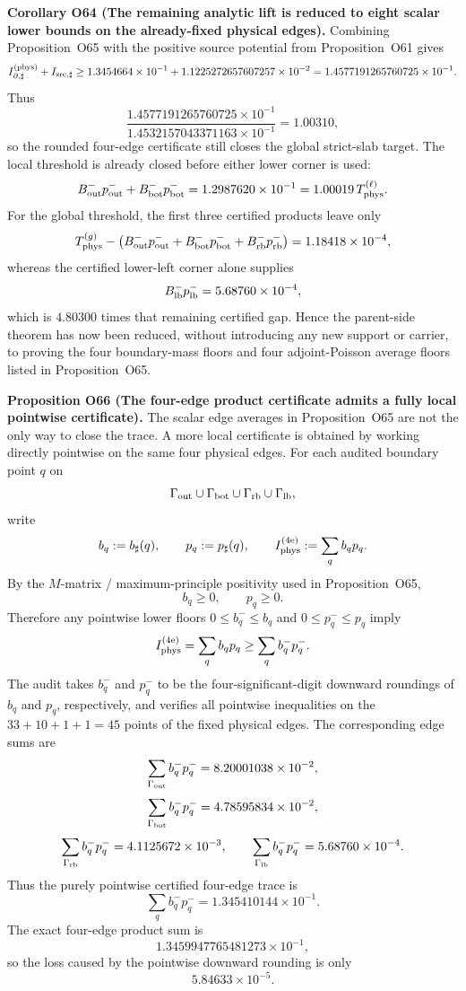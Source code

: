 \documentclass[aps,prd,onecolumn,notitlepage,nofootinbib,superscriptaddress,11pt,floatfix]{revtex4-2}
\begin{document}
\medskip\noindent\textbf{Corollary O64 (The remaining analytic lift is reduced to eight scalar lower bounds on the already-fixed physical edges).}
Combining Proposition~O65 with the positive source potential from Proposition~O61 gives
\[
I_{\partial,\sharp}^{(\rm phys)}+I_{{\rm src},\sharp}
\ge
1.3454664\times10^{-1}
+1.1225272657607257\times10^{-2}
=
1.4577191265760725\times10^{-1}.
\]
Thus
\[
\frac{
1.4577191265760725\times10^{-1}
}{
1.4532157043371163\times10^{-1}
}
=1.00310,
\]
so the rounded four-edge certificate still closes the global strict-slab target.  The local threshold is already closed before either lower corner is used:
\[
B_{\rm out}^-p_{\rm out}^-+B_{\rm bot}^-p_{\rm bot}^-
=1.2987620\times10^{-1}
=1.00019\,T_{\rm phys}^{(\ell)}.
\]
For the global threshold, the first three certified products leave only
\[
T_{\rm phys}^{(g)}
-
\left(
B_{\rm out}^-p_{\rm out}^-
+B_{\rm bot}^-p_{\rm bot}^-
+B_{\rm rb}^-p_{\rm rb}^-
\right)
=1.18418\times10^{-4},
\]
whereas the certified lower-left corner alone supplies
\[
B_{\rm lb}^-p_{\rm lb}^-=5.68760\times10^{-4},
\]
which is \(4.80300\) times that remaining certified gap.  Hence the parent-side theorem has now been reduced, without introducing any new support or carrier, to proving the four boundary-mass floors and four adjoint-Poisson average floors listed in Proposition~O65.

\medskip\noindent\textbf{Proposition O66 (The four-edge product certificate admits a fully local pointwise certificate).}
The scalar edge averages in Proposition~O65 are not the only way to close the trace.  A more local certificate is obtained by working directly pointwise on the same four physical edges.  For each audited boundary point \(q\) on
\[
\Gamma_{\rm out}\cup\Gamma_{\rm bot}\cup\Gamma_{\rm rb}\cup\Gamma_{\rm lb},
\]
write
\[
b_q:=b_\sharp(q),
\qquad
p_q:=p_\sharp(q),
\qquad
I_{\rm phys}^{(4{\rm e})}:=\sum_q b_qp_q.
\]
By the \(M\)-matrix / maximum-principle positivity used in Proposition~O65,
\[
b_q\ge0,\qquad p_q\ge0.
\]
Therefore any pointwise lower floors \(0\le b_q^-\le b_q\) and \(0\le p_q^-\le p_q\) imply
\[
I_{\rm phys}^{(4{\rm e})}
=
\sum_q b_qp_q
\ge
\sum_q b_q^-p_q^-.
\]
The audit
takes \(b_q^-\) and \(p_q^-\) to be the four-significant-digit downward roundings of \(b_q\) and \(p_q\), respectively, and verifies all pointwise inequalities on the \(33+10+1+1=45\) points of the fixed physical edges.  The corresponding edge sums are
\[
\sum_{\Gamma_{\rm out}} b_q^-p_q^-=8.20001038\times10^{-2},
\]
\[
\sum_{\Gamma_{\rm bot}} b_q^-p_q^-=4.78595834\times10^{-2},
\]
\[
\sum_{\Gamma_{\rm rb}} b_q^-p_q^-=4.1125672\times10^{-3},
\qquad
\sum_{\Gamma_{\rm lb}} b_q^-p_q^-=5.68760\times10^{-4}.
\]
Thus the purely pointwise certified four-edge trace is
\[
\sum_q b_q^-p_q^-
=
1.345410144\times10^{-1}.
\]
The exact four-edge product sum is
\[
1.3459947765481273\times10^{-1},
\]
so the loss caused by the pointwise downward rounding is only
\[
5.84633\times10^{-5}.
\]
\end{document}
